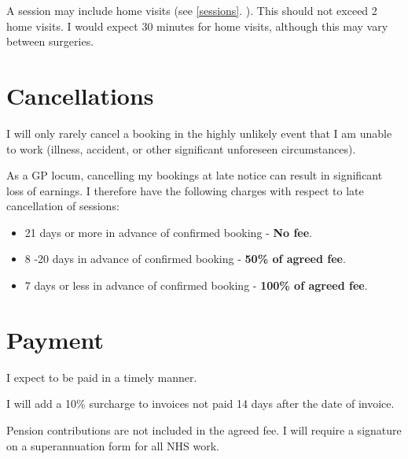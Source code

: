 \documentclass[12pt, a4paper]{article}
\begin{document}
A session may include home visits (see \ref{sessions}. ).
This should not exceed 2 home visits.
I would expect 30 minutes for home visits, although this may vary between surgeries.

\section{Cancellations}

I will only rarely cancel a booking in the highly unlikely event that I am unable to work (illness, accident, or other significant unforeseen circumstances).

As a GP locum, cancelling my bookings at late notice can result in significant loss of earnings.
I therefore have the following charges with respect to late cancellation of sessions:

\begin{itemize}
  \item 21 days or more in advance of confirmed booking - \textbf{No fee}.
  \item 8 -20 days in advance of confirmed booking - \textbf{50\% of agreed fee}.
  \item 7 days or less in advance of confirmed booking - \textbf{100\% of agreed fee}.
\end{itemize}

\section{Payment}

I expect to be paid in a timely manner.

I will add a 10\% surcharge to invoices not paid 14 days after the date of invoice.

Pension contributions are not included in the agreed fee.
I will require a signature on a superannuation form for all NHS work.
\end{document}
